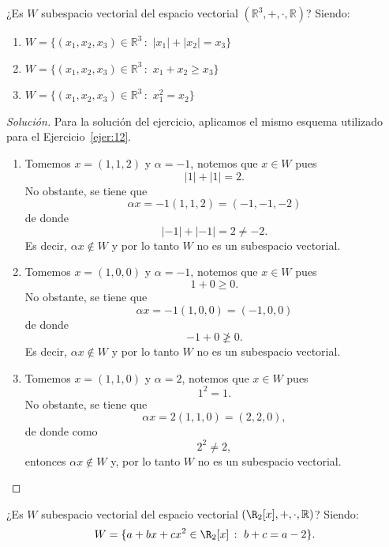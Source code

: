 \documentclass[a4,11pt]{aleph-notas}
\begin{document}
\begin{ejer}
    ¿Es $W$ subespacio vectorial del espacio vectorial $(\mathbb{R}^3, + , \cdot, \mathbb{R})$? Siendo:
\begin{enumerate}
\item $W = \{(x_1, x_2, x_3) \in \mathbb{R}^3 \,:\, \, |x_1| + |x_2| = x_3\}$
\item $W = \{(x_1, x_2, x_3) \in \mathbb{R}^3 \,:\, \, x_1 + x_2 \geq x_3\}$
\item $W = \{(x_1, x_2, x_3) \in \mathbb{R}^3 \,:\, \, x_1^2 = x_2 \}$
\end{enumerate}
\end{ejer}

\begin{proof}[Solución]\hspace{0pt}
    Para la solución del ejercicio, aplicamos el mismo esquema utilizado para el Ejercicio~\ref{ejer:12}.

    \begin{enumerate}
        \item Tomemos $x=(1,1,2)$ y $\alpha=-1$, notemos que $x\in W$ pues 
        \[
            |1|+|1| = 2.
        \]
        No obstante, se tiene que 
        \[
            \alpha x = -1(1,1,2) = (-1,-1,-2)
        \]
        de donde
        \[
            |-1|+|-1| = 2 \neq -2.
        \]
        Es decir, $\alpha x\notin W$ y por lo tanto $W$ no es un subespacio vectorial.
        
        \item Tomemos $x=(1,0,0)$ y $\alpha = -1$, notemos que $x\in W$ pues 
        \[
            1 + 0 \geq 0.
        \]
        No obstante, se tiene que 
        \[
            \alpha x = -1 (1,0,0) = (-1,0,0)
        \]
        de donde
        \[
            -1 + 0 \not\geq 0.
        \]
        Es decir, $\alpha x\notin W$ y por lo tanto $W$ no es un subespacio vectorial.
    \item 
        Tomemos $x=(1,1,0)$ y $\alpha=2$, notemos que $x\in W$ pues   
        \[
            1^2 = 1.
        \]
        No obstante, se tiene que 
        \[
            \alpha x = 2(1,1,0) = (2,2,0),
        \]
        de donde como 
        \[
            2^2 \neq 2,
        \]
        entonces $\alpha x\notin W$ y, por lo tanto $W$ no es un subespacio vectorial. \qedhere
    \end{enumerate}
\end{proof}

\begin{ejer}
    ¿Es $W$ subespacio vectorial del espacio vectorial $(\R_2[x], + , \cdot, \mathbb{R})$? Siendo: 
    \[W = \{ a + bx + cx^2 \in \R_2[x]\,:\, \, b + c = a - 2 \}.\]
\end{ejer}
\end{document}
